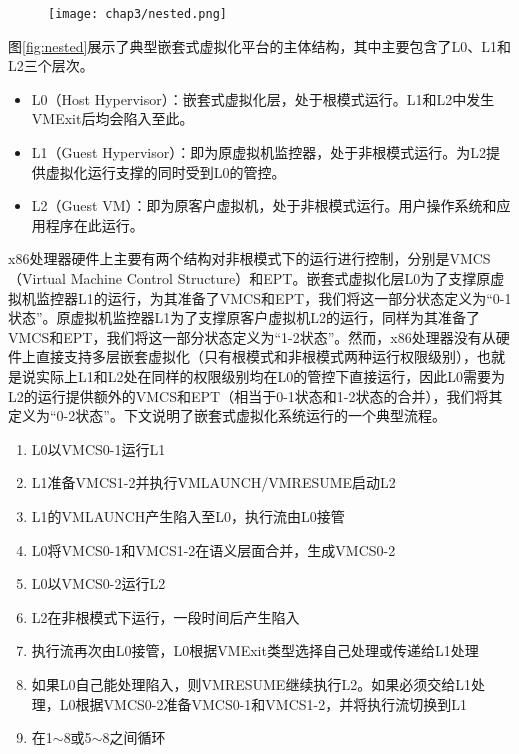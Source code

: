 \begin{figure}[!htbp]
  \centering
  \texttt{[image: chap3/nested.png]}
\end{figure}

图\ref{fig:nested}展示了典型嵌套式虚拟化平台的主体结构，其中主要包含了L0、L1和L2三个层次。

\begin{itemize}
\item{L0（Host Hypervisor）：嵌套式虚拟化层，处于根模式运行。L1和L2中发生VMExit后均会陷入至此。}
\item{L1（Guest Hypervisor）：即为原虚拟机监控器，处于非根模式运行。为L2提供虚拟化运行支撑的同时受到L0的管控。}
\item{L2（Guest VM）：即为原客户虚拟机，处于非根模式运行。用户操作系统和应用程序在此运行。}
\end{itemize}

x86处理器硬件上主要有两个结构对非根模式下的运行进行控制，分别是VMCS（Virtual Machine Control Structure）和EPT。嵌套式虚拟化层L0为了支撑原虚拟机监控器L1的运行，为其准备了VMCS和EPT，我们将这一部分状态定义为``0-1状态''。原虚拟机监控器L1为了支撑原客户虚拟机L2的运行，同样为其准备了VMCS和EPT，我们将这一部分状态定义为``1-2状态''。然而，x86处理器没有从硬件上直接支持多层嵌套虚拟化（只有根模式和非根模式两种运行权限级别），也就是说实际上L1和L2处在同样的权限级别均在L0的管控下直接运行，因此L0需要为L2的运行提供额外的VMCS和EPT（相当于0-1状态和1-2状态的合并），我们将其定义为``0-2状态''。下文说明了嵌套式虚拟化系统运行的一个典型流程。

\begin{enumerate}
\item L0以VMCS0-1运行L1
\item L1准备VMCS1-2并执行VMLAUNCH/VMRESUME启动L2
\item L1的VMLAUNCH产生陷入至L0，执行流由L0接管
\item L0将VMCS0-1和VMCS1-2在语义层面合并，生成VMCS0-2
\item L0以VMCS0-2运行L2
\item L2在非根模式下运行，一段时间后产生陷入
\item 执行流再次由L0接管，L0根据VMExit类型选择自己处理或传递给L1处理
\item 如果L0自己能处理陷入，则VMRESUME继续执行L2。如果必须交给L1处理，L0根据VMCS0-2准备VMCS0-1和VMCS1-2，并将执行流切换到L1
\item 在1$\sim$8或5$\sim$8之间循环
\end{enumerate}

